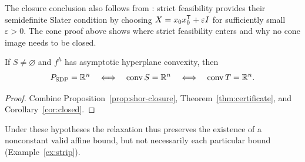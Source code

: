 The closure conclusion also follows from
\citet[Theorem~2.1]{FujieKojima1997}: strict feasibility provides
their semidefinite Slater condition by choosing
$X=x_0x_0^{\mathsf T}+\varepsilon I$ for sufficiently small
$\varepsilon>0$. The cone proof above shows where strict feasibility
enters and why no cone image needs to be closed.

\begin{corollary}\label{cor:shor-hull}
If $S\ne\varnothing$ and $f^h$ has asymptotic hyperplane convexity,
then
\[
 P_{\rm SDP}=\mathbb R^n\quad\Longleftrightarrow\quad\operatorname{conv} S=\mathbb R^n
             \quad\Longleftrightarrow\quad\operatorname{conv} T=\mathbb R^n.
\]
\end{corollary}
\begin{proof}
Combine Proposition~\ref{prop:shor-closure},
Theorem~\ref{thm:certificate}, and Corollary~\ref{cor:closed}.
\end{proof}

Under these hypotheses the relaxation thus preserves the existence of
a nonconstant valid affine bound, but not necessarily each particular
bound (Example~\ref{ex:strip}).

